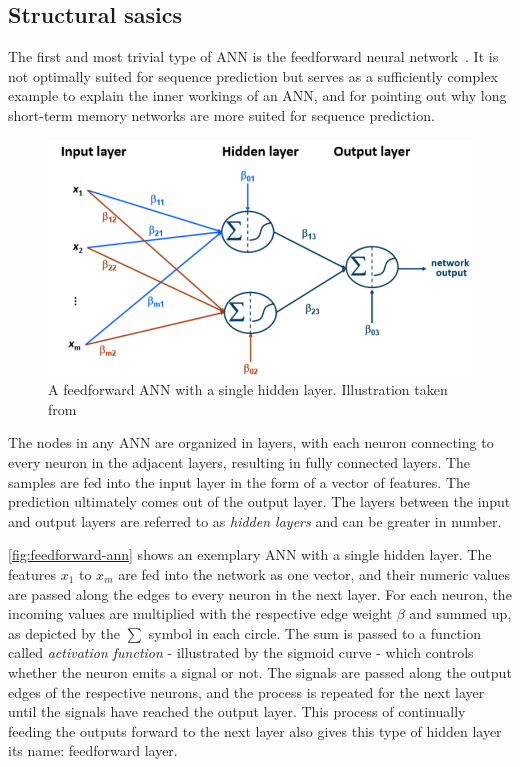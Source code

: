\subsection{Structural sasics}\label{sec:feedforward-networks}
The first and most trivial type of ANN is the feedforward neural network~\cite{schmidhuber2015deep}. It is not optimally suited for sequence prediction but serves as a sufficiently complex example to explain the inner workings of an ANN, and for pointing out why long short-term memory networks are more suited for sequence prediction.

\begin{figure}[!htb]
    \centering
    \includegraphics[width=.85\textwidth]{gfx/feedforward-neural-network.png}
    \caption[A feedforward ANN with a single hidden layer]{A feedforward ANN with a single hidden layer. Illustration taken from~\cite{lessmannBADS}}
    \label{fig:feedforward-ann}
\end{figure}

The nodes in any ANN are organized in layers, with each neuron connecting to every neuron in the adjacent layers, resulting in fully connected layers. The samples are fed into the input layer in the form of a vector of features. The prediction ultimately comes out of the output layer. The layers between the input and output layers are referred to as \textit{hidden layers} and can be greater in number.

\autoref{fig:feedforward-ann} shows an exemplary ANN with a single hidden layer. The features $x_1$ to $x_m$ are fed into the network as one vector, and their numeric values are passed along the edges to every neuron in the next layer. For each neuron, the incoming values are multiplied with the respective edge weight $\beta$ and summed up, as depicted by the $\sum$ symbol in each circle. The sum is passed to a function called \textit{activation function} - illustrated by the sigmoid curve - which controls whether the neuron emits a signal or not. The signals are passed along the output edges of the respective neurons, and the process is repeated for the next layer until the signals have reached the output layer.
This process of continually feeding the outputs forward to the next layer also gives this type of hidden layer its name: feedforward layer.

